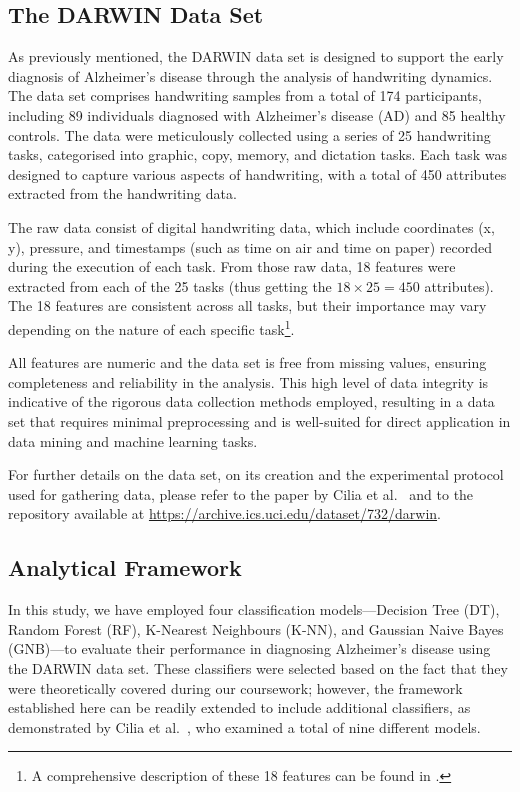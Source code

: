 \documentclass[a4paper, 11pt]{article}
\begin{document}
\subsection{The DARWIN Data Set} \label{sec:DARWIN-data-set}

As previously mentioned, the DARWIN data set is designed to support the early diagnosis of Alzheimer's disease through the analysis of handwriting dynamics. The data set comprises handwriting samples from a total of 174 participants, including 89 individuals diagnosed with Alzheimer's disease (AD) and 85 healthy controls. The data were meticulously collected using a series of 25 handwriting tasks, categorised into graphic, copy, memory, and dictation tasks. Each task was designed to capture various aspects of handwriting, with a total of 450 attributes extracted from the handwriting data.

The raw data consist of digital handwriting data, which include coordinates (x, y), pressure, and timestamps (such as time on air and time on paper) recorded during the execution of each task. From those raw data, 18 features were extracted from each of the 25 tasks (thus getting the $18 \times 25 = 450$ attributes). The 18 features are consistent across all tasks, but their importance may vary depending on the nature of each specific task\footnote{A comprehensive description of these 18 features can be found in \cite{Cilia2022}.}.

All features are numeric and the data set is free from missing values, ensuring completeness and reliability in the analysis. This high level of data integrity is indicative of the rigorous data collection methods employed, resulting in a data set that requires minimal preprocessing and is well-suited for direct application in data mining and machine learning tasks.

For further details on the data set, on its creation and the experimental protocol used for gathering data, please refer to the paper by Cilia et al.~\cite{Cilia2022} and to the repository available at \url{https://archive.ics.uci.edu/dataset/732/darwin}.

\subsection{Analytical Framework} \label{sec:framework}

In this study, we have employed four classification models—Decision Tree (DT), Random Forest (RF), K-Nearest Neighbours (K-NN), and Gaussian Naive Bayes (GNB)—to evaluate their performance in diagnosing Alzheimer's disease using the DARWIN data set. These classifiers were selected based on the fact that they were theoretically covered during our coursework; however, the framework established here can be readily extended to include additional classifiers, as demonstrated by Cilia et al.~\cite{Cilia2022}, who examined a total of nine different models.
\end{document}
